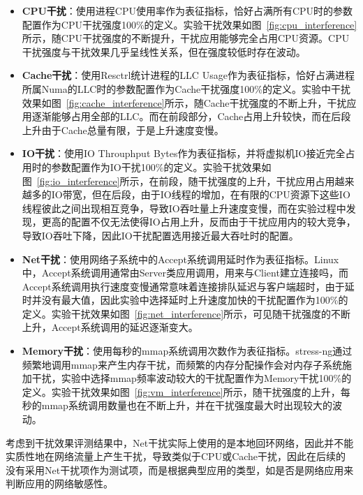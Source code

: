 \begin{itemize}
    \item \textbf{CPU干扰}：使用进程CPU使用率作为表征指标，恰好占满所有CPU时的参数配置作为CPU干扰强度100\%的定义。实验干扰效果如图~\ref{fig:cpu_interference}所示，随CPU干扰强度的不断提升，干扰应用能够完全占用CPU资源。CPU干扰强度与干扰效果几乎呈线性关系，但在强度较低时存在波动。
    
    \item \textbf{Cache干扰}：使用Resctrl统计进程的LLC Usage作为表征指标，恰好占满进程所属Numa的LLC时的参数配置作为Cache干扰强度100\%的定义。实验中干扰效果如图~\ref{fig:cache_interference}所示，随Cache干扰强度的不断上升，干扰应用逐渐能够占用全部的LLC。而在前段部分，Cache占用上升较快，而在后段上升由于Cache总量有限，于是上升速度变慢。
    
    \item \textbf{IO干扰}：使用IO Throuphput Bytes作为表征指标，并将虚拟机IO接近完全占用时的参数配置作为IO干扰100\%的定义。实验干扰效果如图~\ref{fig:io_interference}所示，在前段，随干扰强度的上升，干扰应用占用越来越多的IO带宽，但在后段，由于IO线程的增加，在有限的CPU资源下这些IO线程彼此之间出现相互竞争，导致IO吞吐量上升速度变慢，而在实验过程中发现，更高的配置不仅无法使得IO占用上升，反而由于干扰应用内的较大竞争，导致IO吞吐下降，因此IO干扰配置选用接近最大吞吐时的配置。
    
    \item \textbf{Net干扰}：使用网络子系统中的Accept系统调用延时作为表征指标。Linux中，Accept系统调用通常由Server类应用调用，用来与Client建立连接吗，而Accept系统调用执行速度变慢通常意味着连接排队延迟与客户端超时，由于延时并没有最大值，因此实验中选择延时上升速度加快的干扰配置作为100\%的定义。实验干扰效果如图~\ref{fig:net_interference}所示，可见随干扰强度的不断上升，Accept系统调用的延迟逐渐变大。
    
    \item \textbf{Memory干扰}：使用每秒的mmap系统调用次数作为表征指标。stress-ng通过频繁地调用mmap来产生内存干扰，而频繁的内存分配操作会对内存子系统施加干扰，实验中选择mmap频率波动较大的干扰配置作为Memory干扰100\%的定义。实验干扰效果如图~\ref{fig:vm_interference}所示，随干扰强度的上升，每秒的mmap系统调用数量也在不断上升，并在干扰强度最大时出现较大的波动。
\end{itemize}

考虑到干扰效果评测结果中，Net干扰实际上使用的是本地回环网络，因此并不能实质性地在网络流量上产生干扰，导致类似于CPU或Cache干扰，因此在后续的
没有采用Net干扰项作为测试项，而是根据典型应用的类型，如是否是网络应用来判断应用的网络敏感性。

